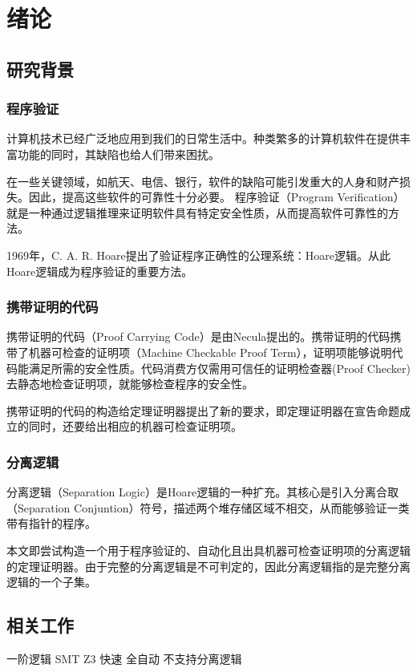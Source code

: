 \chapter{绪论}
\label{chap:intro}

\section{研究背景}
\subsection{程序验证}
计算机技术已经广泛地应用到我们的日常生活中。种类繁多的计算机软件在提供丰富功能的同时，其缺陷也给人们带来困扰。

在一些关键领域，如航天、电信、银行，软件的缺陷可能引发重大的人身和财产损失。因此，提高这些软件的可靠性十分必要。
程序验证（Program Verification）就是一种通过逻辑推理来证明软件具有特定安全性质，从而提高软件可靠性的方法。

1969年，C. A. R. Hoare提出了验证程序正确性的公理系统：Hoare逻辑\cite{Hoare69}。从此Hoare逻辑成为程序验证的重要方法。

\subsection{携带证明的代码}
携带证明的代码（Proof Carrying Code）\cite{Necula97}\cite{Necula98}是由Necula提出的。携带证明的代码携带了机器可检查的证明项（Machine Checkable Proof Term），证明项能够说明代码能满足所需的安全性质。代码消费方仅需用可信任的证明检查器(Proof Checker)去静态地检查证明项，就能够检查程序的安全性。

携带证明的代码的构造给定理证明器提出了新的要求，即定理证明器在宣告命题成立的同时，还要给出相应的机器可检查证明项。

\subsection{分离逻辑}
分离逻辑（Separation Logic）\cite{Reynolds02}是Hoare逻辑的一种扩充。其核心是引入分离合取（Separation Conjuntion）符号，描述两个堆存储区域不相交，从而能够验证一类带有指针的程序。

本文即尝试构造一个用于程序验证的、自动化且出具机器可检查证明项的分离逻辑的定理证明器。由于完整的分离逻辑是不可判定的，因此分离逻辑指的是完整分离逻辑的一个子集。

\section{相关工作}
一阶逻辑 SMT Z3 快速 全自动 不支持分离逻辑

